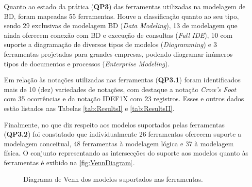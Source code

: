 Quanto ao estado da prática (\textbf{QP3}) das ferramentas utilizadas na modelagem de \ac{BD}, foram mapeadas 55 ferramentas. 
Houve a classificação quanto ao seu tipo, sendo 29 exclusivas de modelagem \ac{BD} (\textit{Data Modeling}), 13 de modelagem que ainda oferecem conexão com \ac{BD} e execução de consultas (\textit{Full IDE}), 10 com suporte a diagramação de diversos tipos de modelos (\textit{Diagramming}) e 3 ferramentas projetadas para grandes empresas, podendo diagramar inúmeros tipos de documentos e processos (\textit{Enterprise Modeling}). 

Em relação às notações utilizadas nas ferramentas (\textbf{QP3.1}) foram identificados mais de 10 (dez) variedades de notações, com destaque a notação \textit{Crow's Foot} com 35 ocorrências e da notação IDEF1X com 23 registros. 
Esses e outros dados estão listados nas Tabelas \ref{tab:ResultsI} e \ref{tab:ResultsII}.

Finalmente, no que diz respeito aos modelos suportados pelas ferramentas (\textbf{QP3.2}) foi constatado que individualmente 26 ferramentas oferecem suporte a modelagem conceitual, 48 ferramentas à modelagem lógica e 37 à modelagem física. 
O conjunto representando as intersecções do suporte aos modelos quanto às ferramentas é exibido na \autoref{fig:VennDiagram}.

\begin{figure}[!htb]
\centering
\caption{Diagrama de Venn dos modelos suportados nas ferramentas.}

\label{fig:VennDiagram}
\end{figure}


